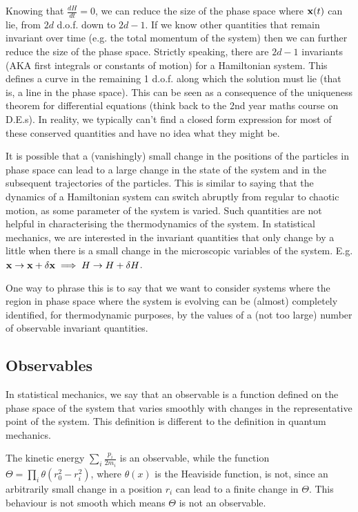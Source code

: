 \documentclass{article}
\begin{document}
Knowing that $\frac{dH}{dt}=0$, we can reduce the size of the phase space where ${\bf x}(t)$ can lie, from $2d$ d.o.f. down to $2d-1$. If we know other quantities that remain invariant over time (e.g. the total momentum of the system) then we can further reduce the size of the phase space. Strictly speaking, there are $2d-1$ invariants (AKA first integrals or constants of motion) for a Hamiltonian system. This defines a curve in the remaining 1 d.o.f. along which the solution must lie (that is, a line in the phase space). This can be seen as a consequence of the uniqueness theorem for differential equations (think back to the 2nd year maths course on D.E.s). In reality, we typically can't find a closed form expression for most of these conserved quantities and have no idea what they might be.

It is possible that a (vanishingly) small change in the positions of the particles in phase space can lead to a large change in the state of the system and in the subsequent trajectories of the particles.
This is similar to saying that the dynamics of a Hamiltonian system can switch abruptly from regular to chaotic motion, as some parameter of the system is varied. 
Such quantities are not helpful in characterising the thermodynamics of the system.
In statistical mechanics, we are interested in the invariant quantities that only change by a little when there is a small change in the microscopic variables of the system. 
E.g. ${\bf x}\rightarrow {\bf x}+\delta {\bf x} \implies H\rightarrow H+\delta H$.

One way to phrase this is to say that we want to consider systems where the region in phase space where the system is evolving can be (almost) completely identified, for thermodynamic purposes, by the values of a (not too large) number of observable invariant quantities.

\subsection{Observables}
In statistical mechanics, we say that an observable is a function defined on the phase space of the system that varies smoothly with changes in the representative point of the system. This definition is different to the definition in quantum mechanics.

The kinetic energy $\sum_i \frac{p_i}{2m_i}$ is an observable, while the function $\Theta = \prod_i \theta(r_0^2-r_i^2)$, where $\theta(x)$ is the Heaviside function, is not, since an arbitrarily small change in a position $r_i$ can lead to a finite change in $\Theta$. This behaviour is not smooth which means $\Theta$ is not an observable.
\end{document}
